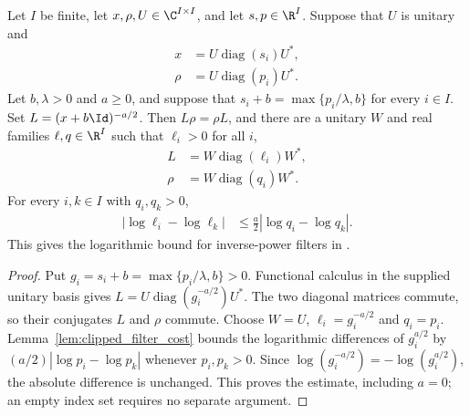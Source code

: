 \begin{theorem}
    \label{thm:shifted_filter_clipping}
    \leanok
    Let $I$ be finite, let $x,\rho,U\in\C^{I\times I}$, and let
    $s,p\in\R^I$. Suppose that $U$ is unitary and
    \begin{align}
        x    & =U\operatorname{diag}(s_i)U^*, \\
        \rho & =U\operatorname{diag}(p_i)U^*.
    \end{align}
    Let $b,\lambda>0$ and $a\ge0$, and suppose that
    $s_i+b=\max\{p_i/\lambda,b\}$ for every $i\in I$.
    Set $L=(x+b\Id)^{-a/2}$. Then $L\rho=\rho L$, and there are a unitary
    $W$ and real families $\ell,q\in\R^I$ such that $\ell_i>0$ for all $i$,
    \begin{align}
        L    & =W\operatorname{diag}(\ell_i)W^*, \\
        \rho & =W\operatorname{diag}(q_i)W^*.
    \end{align}
    For every $i,k\in I$ with $q_i,q_k>0$,
    \begin{align}
        |\log\ell_i-\log\ell_k|
         & \le \frac a2|\log q_i-\log q_k|.
    \end{align}
    This gives the logarithmic bound for inverse-power filters in
    \cite[Section~4, clipped eigenvalues]{OpenAI2026PolynomialPEPS}.
\end{theorem}
\begin{proof}
    \leanok
    Put $g_i=s_i+b=\max\{p_i/\lambda,b\}>0$. Functional calculus in the
    supplied unitary basis gives $L=U\operatorname{diag}(g_i^{-a/2})U^*$.
    The two diagonal matrices commute, so their conjugates $L$ and $\rho$
    commute. Choose $W=U$, $\ell_i=g_i^{-a/2}$ and $q_i=p_i$.
    Lemma~\ref{lem:clipped_filter_cost} bounds the logarithmic differences
    of $g_i^{a/2}$ by $(a/2)|\log p_i-\log p_k|$ whenever $p_i,p_k>0$.
    Since $\log(g_i^{-a/2})=-\log(g_i^{a/2})$, the absolute difference is
    unchanged. This proves the estimate, including $a=0$; an empty index set
    requires no separate argument.
\end{proof}

